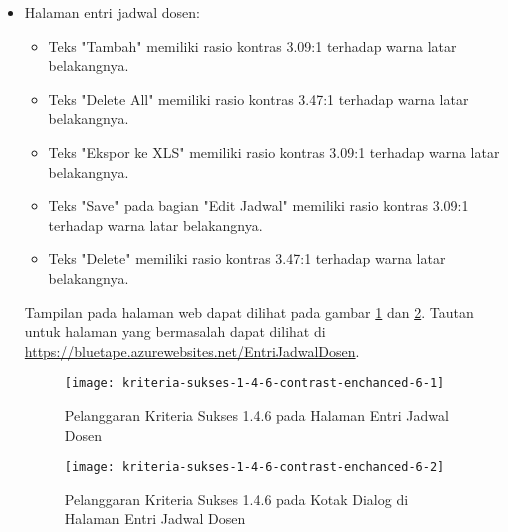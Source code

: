 \begin{itemize}
    \item Halaman entri jadwal dosen: 
    \begin{itemize}
        \item Teks "Tambah" memiliki rasio kontras 3.09:1 terhadap warna latar belakangnya.
        \item Teks "Delete All" memiliki rasio kontras 3.47:1 terhadap warna latar belakangnya.
        \item Teks "Ekspor ke XLS" memiliki rasio kontras 3.09:1 terhadap warna latar belakangnya.
        \item Teks "Save" pada bagian "Edit Jadwal" memiliki rasio kontras 3.09:1 terhadap warna latar belakangnya.
        \item Teks "Delete" memiliki rasio kontras 3.47:1 terhadap warna latar belakangnya.
    \end{itemize}
    Tampilan pada halaman web dapat dilihat pada gambar \ref{fig:1.4.6_contrast_enchanced_6_1} dan \ref{fig:1.4.6_contrast_enchanced_6_2}. Tautan untuk halaman yang bermasalah dapat dilihat di \url{https://bluetape.azurewebsites.net/EntriJadwalDosen}.
    \begin{figure}[H]
        \centering  
        \texttt{[image: kriteria-sukses-1-4-6-contrast-enchanced-6-1]}  
        \caption[Pelanggaran Kriteria Sukses 1.4.6 pada Halaman Entri Jadwal Dosen]{Pelanggaran Kriteria Sukses 1.4.6 pada Halaman Entri Jadwal Dosen}
        \label{fig:1.4.6_contrast_enchanced_6_1}  
    \end{figure} 
    
    \begin{figure}[H]
        \centering  
        \texttt{[image: kriteria-sukses-1-4-6-contrast-enchanced-6-2]}  
        \caption[Pelanggaran Kriteria Sukses 1.4.6 pada Kotak Dialog di Halaman Entri Jadwal Dosen]{Pelanggaran Kriteria Sukses 1.4.6 pada Kotak Dialog di Halaman Entri Jadwal Dosen}
        \label{fig:1.4.6_contrast_enchanced_6_2}  
    \end{figure} 


\end{itemize}
